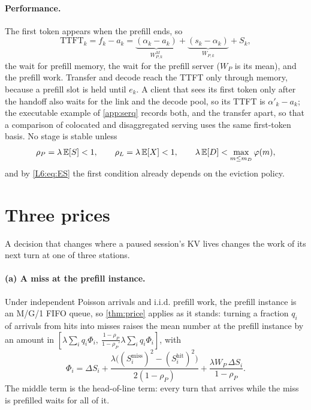 \paragraph{Performance.} The first token appears when the prefill ends, so
\begin{equation}\label{L6:eq:ttft}
  \mathrm{TTFT}_k=f_k-a_k
  ={\underbrace{(\alpha_k-a_k)}_{W^M_{P,k}}}
  +{\underbrace{(s_k-\alpha_k)}_{W_{P,k}}}+S_k ,
\end{equation}
the wait for prefill memory, the wait for the prefill server ($W_P$ is its mean), and
the prefill work. Transfer and decode reach the TTFT only through memory, because a
prefill slot is held until $e_k$. A client that sees its first token only after the
handoff also waits for the link and the decode pool, so its TTFT is $\alpha'_k-a_k$; the
executable example of \cref{app:serq} records both, and the transfer apart, so that a
comparison of colocated and disaggregated serving uses the same first-token basis.
No stage is stable unless
\begin{equation}\label{L6:eq:stable}
  \rho_P=\lambda\,\mathbb{E}[S]<1,\qquad \rho_L=\lambda\,\mathbb{E}[X]<1,\qquad
  \lambda\,\mathbb{E}[D]<\max_{m\le m_D}\varphi(m),
\end{equation}
and by \eqref{L6:eq:ES} the first condition already depends on the eviction policy.

\section{Three prices}\label{L6:sec:prices}

A decision that changes where a paused session's KV lives changes the work of its next
turn at one of three stations.

\paragraph{(a) A miss at the prefill instance.} Under independent Poisson arrivals and i.i.d. prefill work, the
prefill instance is an M/G/1 FIFO queue, so \cref{thm:price} applies as it
stands: turning a fraction $q_i$ of arrivals from hits into misses raises the mean number
at the prefill instance by an amount in
$[\lambda\sum_iq_i\Phi_i,\ \frac{1-\rho_P}{1-\rho_P'}\lambda\sum_iq_i\Phi_i]$, with
\[
  \Phi_i=\Delta S_i
   +\frac{\lambda\bigl((S_i^{\mathrm{miss}})^2-(S_i^{\mathrm{hit}})^2\bigr)}{2(1-\rho_P)}
   +\frac{\lambda W_P\,\Delta S_i}{1-\rho_P}.
\]
The middle term is the head-of-line term: every turn that arrives while the miss is
prefilled waits for all of it.

